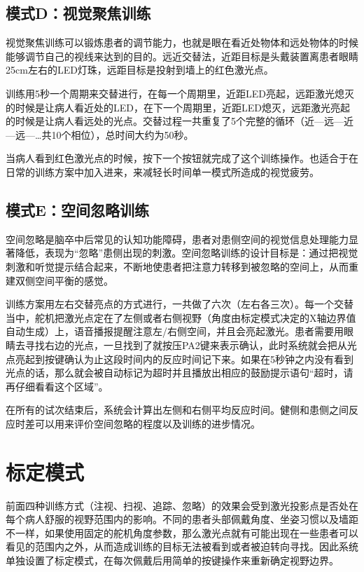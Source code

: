 \subsection{模式D：视觉聚焦训练}

视觉聚焦训练可以锻炼患者的调节能力，也就是眼在看近处物体和远处物体的时候能够调节自己的视线来达到的目的。远近交替法，近距目标是头戴装置离患者眼睛25cm左右的LED灯珠，远距目标是投射到墙上的红色激光点。

训练用5秒一个周期来交替进行，在每一个周期里，近距LED亮起，远距激光熄灭的时候是让病人看近处的LED，在下一个周期里，近距LED熄灭，远距激光亮起的时候是让病人看远处的光点。交替过程一共重复了5个完整的循环（近—远—近—远—…共10个相位），总时间大约为50秒。

当病人看到红色激光点的时候，按下一个按钮就完成了这个训练操作。也适合于在日常的训练方案中加入进来，来减轻长时间单一模式所造成的视觉疲劳。

\subsection{模式E：空间忽略训练}

空间忽略是脑卒中后常见的认知功能障碍，患者对患侧空间的视觉信息处理能力显著降低，表现为“忽略”患侧出现的刺激。空间忽略训练的设计目标是：通过把视觉刺激和听觉提示结合起来，不断地使患者把注意力转移到被忽略的空间上，从而重建双侧空间平衡的感觉。

训练方案用左右交替亮点的方式进行，一共做了六次（左右各三次）。每一个交替当中，舵机把激光点定在了左侧或者右侧视野（角度由标定模式决定的X轴边界值自动生成）上，语音播报提醒注意左/右侧空间，并且会亮起激光。患者需要用眼睛去寻找右边的光点，一旦找到了就按压PA2键来表示确认，此时系统就会把从光点亮起到按键确认为止这段时间内的反应时间记下来。如果在5秒钟之内没有看到光点的话，那么就会被自动标记为超时并且播放出相应的鼓励提示语句“超时，请再仔细看看这个区域”。

在所有的试次结束后，系统会计算出左侧和右侧平均反应时间。健侧和患侧之间反应时差可以用来评价空间忽略的程度以及训练的进步情况。

\section{标定模式}

前面四种训练方式（注视、扫视、追踪、忽略）的效果会受到激光投影点是否处在每个病人舒服的视野范围内的影响。不同的患者头部佩戴角度、坐姿习惯以及墙距不一样，如果使用固定的舵机角度参数，那么激光点就有可能出现在一些患者可以看见的范围内之外，从而造成训练的目标无法被看到或者被迫转向寻找。因此系统单独设置了标定模式，在每次佩戴后用简单的按键操作来重新确定视野边界。

